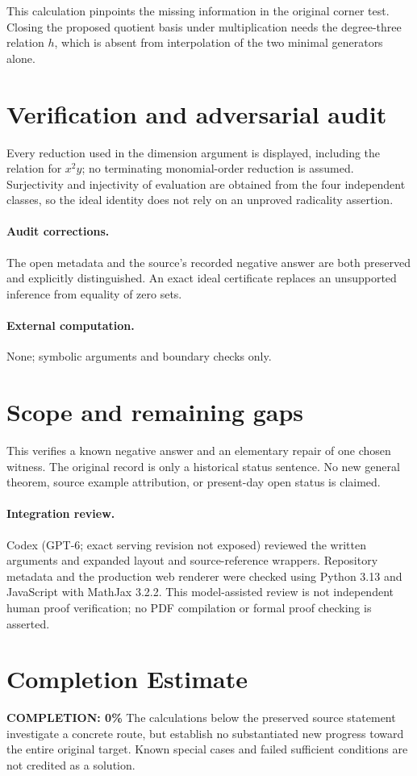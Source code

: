 \documentclass[11pt]{article}
\begin{document}
This calculation pinpoints the missing information in the original corner test. Closing the proposed quotient basis under multiplication needs the degree-three relation $h$, which is absent from interpolation of the two minimal generators alone.
\section{Verification and adversarial audit}
Every reduction used in the dimension argument is displayed, including the relation for $x^2y$; no terminating monomial-order reduction is assumed. Surjectivity and injectivity of evaluation are obtained from the four independent classes, so the ideal identity does not rely on an unproved radicality assertion.
\paragraph{Audit corrections.} The open metadata and the source's recorded negative answer are both preserved and explicitly distinguished. An exact ideal certificate replaces an unsupported inference from equality of zero sets.
\paragraph{External computation.} None; symbolic arguments and boundary checks only.
\section{Scope and remaining gaps}
This verifies a known negative answer and an elementary repair of one chosen witness. The original record is only a historical status sentence. No new general theorem, source example attribution, or present-day open status is claimed.
\paragraph{Integration review.} Codex (GPT-6; exact serving revision not exposed) reviewed the written arguments and expanded layout and source-reference wrappers. Repository metadata and the production web renderer were checked using Python 3.13 and JavaScript with MathJax 3.2.2. This model-assisted review is not independent human proof verification; no PDF compilation or formal proof checking is asserted.

\section{Completion Estimate}
\noindent\textbf{COMPLETION: 0\%}
The calculations below the preserved source statement investigate a concrete route,
but establish no substantiated new progress toward the entire original target.
Known special cases and failed sufficient conditions are not credited as a solution.
\end{document}
